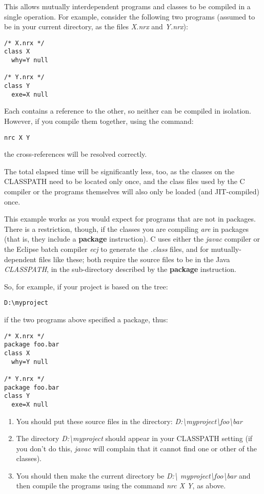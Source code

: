 This allows mutually interdependent programs and classes to be compiled
in a single operation.  For example, consider the following two programs
(assumed to be in your current directory, as the files \emph{X.nrx}
and \emph{Y.nrx}):
\begin{lstlisting}[label=dependencies,caption=Dependencies]
/* X.nrx */
class X
  why=Y null

/* Y.nrx */
class Y
  exe=X null
\end{lstlisting}
Each contains a reference to the other, so neither can be compiled in
isolation.  However, if you compile them together, using the command:
\begin{verbatim}
nrc X Y
\end{verbatim}
 the cross-references will be resolved correctly.

The total elapsed time will be significantly less, too, as the classes
on the CLASSPATH need to be located only once, and the class files used
by the \nr{}C compiler or the programs themselves will also only be
loaded (and JIT-compiled) once.

This example works as you would expect for programs that are not in
packages.  There is a restriction, though, if the classes you are
compiling \emph{are} in packages (that is, they include a
\textbf{package} instruction).  \nr{}C uses either the \emph{javac}
compiler or the Eclipse batch compiler \emph{ecj} to generate the \emph{.class} files, and for mutually-dependent
files like these; both require the source files to be in the
Java \emph{CLASSPATH}, in the sub-directory described by the \textbf{package}
instruction.


So, for example, if your project is based on the tree:

\texttt{D:\textbackslash myproject}

 if the two programs above specified a package, thus:
\begin{lstlisting}[label=packagedep,caption=Package Dependencies]
/* X.nrx */
package foo.bar
class X
  why=Y null

/* Y.nrx */
package foo.bar
class Y
  exe=X null
\end{lstlisting}


\begin{enumerate}
\item
You should put these source files in the directory:
\emph{D:\textbackslash myproject\textbackslash foo\textbackslash bar}
\item
The directory \emph{D:\textbackslash myproject} should appear in your CLASSPATH
setting (if you don't do this, \emph{javac} will complain that it cannot
find one or other of the classes).
\item
You should then make the current directory be \emph{D:\textbackslash
myproject\textbackslash foo\textbackslash bar}
and then compile the programs using the command \emph{nrc X Y},
as above.
\end{enumerate}

